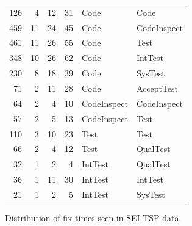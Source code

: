\documentclass{sig-alternate}
\begin{document}
\begin{figure}[!t]
\begin{center}
\begin{tabular}{r|rrr|ll}
126& 4& 12& 31&  Code&Code\\
459& 11& 24& 45&  Code&CodeInspect\\
461& 11& 26& 55&  Code&Test\\
348& 10& 26& 62&  Code&IntTest\\
230& 8& 18& 39&  Code&SysTest\\
71& 2& 11& 28&  Code&AcceptTest\\\hline

64& 2& 4& 10&  CodeInspect&CodeInspect\\
57& 2& 5& 13&  CodeInspect&Test\\\hline



110& 3& 10& 23&  Test&Test\\
66& 2& 4& 12&  Test&QualTest\\\hline


32& 1& 2& 4&  IntTest&QualTest\\
36& 1& 11& 30&  IntTest&IntTest\\
21& 1& 2& 5&  IntTest&SysTest\\
 \end{tabular}
\end{center}
\caption{Distribution of fix times seen in SEI TSP data.}
\label{fig:faw}
\end{figure}
 
\end{document}

